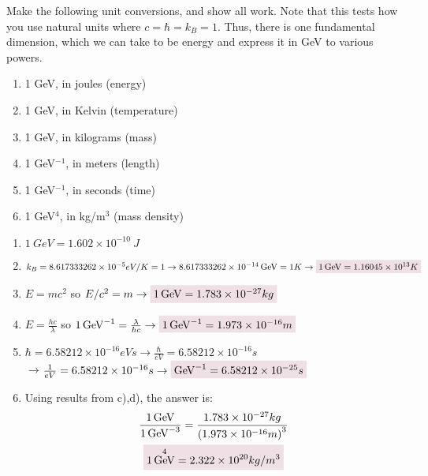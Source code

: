 \documentclass{article}
\date{Due: 01-19-2022}
\author{\EC}
\DeclareMathOperator{\GeV}{GeV}
\begin{document}
\maketitle
\begin{problem}
    Make the following unit conversions, and show all work. 
    Note that this tests how you use natural units where $c = \hbar = k_B = 1$. Thus, there is one 
    fundamental dimension, which we can take to be energy and express it in GeV to various 
    powers.
    \begin{enumerate}[label=\alph*)]
        \item 1 GeV, in joules (energy) 
        \item 1 GeV, in Kelvin (temperature) 
        \item 1 GeV, in kilograms (mass) 
        \item 1 GeV$^{-1}$, in meters (length) 
        \item 1 GeV$^{-1}$, in seconds (time) 
        \item 1 GeV$^{4}$, in kg/m$^3$ (mass density) 
    \end{enumerate}
    \answerline
    \begin{enumerate}[label=\alph*)]
        \item $1~GeV= 1.602\times10^{-10}~J$ 
        \item $k_B=8.617 333 262\times 10^{-5} eV/K=1
            \rightarrow
            8.617 333 262\times 10^{-14} \GeV=1K\rightarrow \coloredanswer{1\GeV=1.16045\times10^{13}K}$
        \item $E=mc^2$ so $E/c^2=m\rightarrow\coloredanswer{1\GeV=1.783 \times10^{-27} kg}$ 
        \item $E=\frac{hc}{\lambda}$ so $1\GeV^{-1}=\frac{\lambda}{hc}\rightarrow \coloredanswer{1\GeV^{-1}=1.973\times10^{-16}m}$
        \item $\hbar=6.58212\times10^{-16}eVs\rightarrow\frac{\hbar}{eV}=6.58212\times10^{-16}s$
        \\
        $\rightarrow$$\frac{1}{eV}=6.58212\times10^{-16}s\rightarrow\coloredanswer{\GeV^{-1}=6.58212\times10^{-25}s}$
        \item Using results from c),d), the answer is:
        \begin{gather*}
            \frac{1\GeV}{1\GeV^{-3}}=\frac{1.783 \times10^{-27} kg}{\qty(1.973\times10^{-16}m)^3}
            \\
            \coloredanswer{1\GeV^{4}=2.322\times10^{20} kg/m^{3}}
        \end{gather*} 
    \end{enumerate}
\end{problem}
\end{document}
